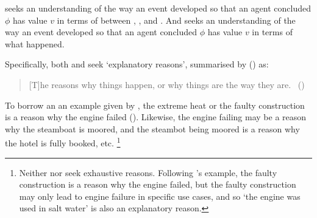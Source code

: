 \begin{note}
  \qWhy{} seeks an understanding of the way an event developed so that an agent concluded \(\phi\) has value \(v\) in terms of \ros{} between , , and .
  And \qHow{} seeks an understanding of the way an event developed so that an agent concluded \(\phi\) has value \(v\) in terms of what happened.

  Specifically, both \qWhy{} and \qHow{} seek `explanatory reasons', summarised by \citeauthor{Hieronymi:2011aa} (\citeyear{Hieronymi:2011aa}) as:
  \begin{quote}
    [T]he reasons why things happen, or why things are the way they are.\newline
    \mbox{ }\hfill\mbox{(\citeyear[410]{Hieronymi:2011aa})}
  \end{quote}
  To borrow an an example given by \citeauthor{Hieronymi:2011aa}, the extreme heat or the faulty construction is a reason why the engine failed (\citeyear[409]{Hieronymi:2011aa}).
  Likewise, the engine failing may be a reason why the steamboat is moored, and the steambot being moored is a reason why the hotel is fully booked, etc.%
  \footnote{
    Neither \qWhy{} nor \qHow{} seek exhaustive reasons.
    Following \citeauthor{Hieronymi:2011aa}'s example, the faulty construction is a reason why the engine failed, but the faulty construction may only lead to engine failure in specific use cases, and so `the engine was used in salt water' is also an explanatory reason.
  }
\end{note}

